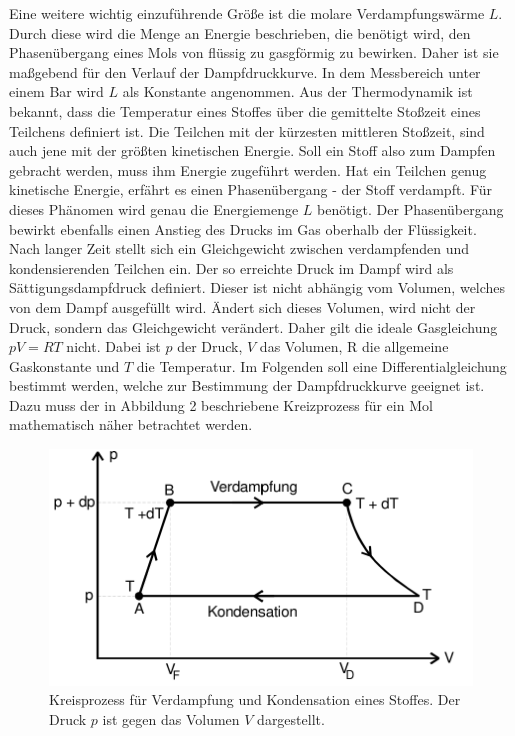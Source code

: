 \noindent
Eine weitere wichtig einzuführende Größe ist die molare Verdampfungswärme $L$. Durch diese wird die Menge an Energie beschrieben, die benötigt wird, den Phasenübergang
eines Mols von flüssig zu gasgförmig zu bewirken.
Daher ist sie maßgebend für den Verlauf der Dampfdruckkurve. In dem Messbereich
unter einem Bar wird $L$ als Konstante angenommen. Aus der Thermodynamik ist bekannt, dass die Temperatur eines Stoffes über die gemittelte Stoßzeit eines Teilchens definiert ist. Die Teilchen
mit der kürzesten mittleren Stoßzeit, sind auch jene mit der größten kinetischen Energie. Soll ein Stoff also zum Dampfen gebracht werden, muss ihm Energie zugeführt werden.
Hat ein Teilchen genug kinetische Energie, erfährt es einen Phasenübergang - der Stoff verdampft. Für dieses Phänomen
wird genau die Energiemenge $L$ benötigt. Der Phasenübergang bewirkt ebenfalls einen Anstieg des Drucks im Gas oberhalb der Flüssigkeit.\\
Nach langer Zeit stellt sich ein Gleichgewicht zwischen verdampfenden und kondensierenden Teilchen ein. Der so erreichte Druck im Dampf
wird als Sättigungsdampfdruck definiert. Dieser ist nicht abhängig vom Volumen, welches von dem Dampf ausgefüllt wird. Ändert sich dieses Volumen, wird nicht der Druck, sondern das Gleichgewicht verändert. 
Daher gilt die ideale Gasgleichung $pV=RT$ nicht. Dabei ist $p$ der Druck, $V$ das Volumen, R die allgemeine Gaskonstante und $T$ die Temperatur. 
Im Folgenden soll eine Differentialgleichung bestimmt werden, welche zur Bestimmung der Dampfdruckkurve geeignet ist.
Dazu muss der in Abbildung 2 beschriebene Kreizprozess für ein Mol mathematisch näher betrachtet werden.
\begin{figure}[h!]
    \centering
    \includegraphics[scale=0.8]{sreen2.jpg}
    \caption{Kreisprozess für Verdampfung und Kondensation eines Stoffes. Der Druck $p$ ist
    gegen das Volumen $V$ dargestellt.\cite{V203_Anleitung} }
    \label{Abb2:Kreisprozess}
\end{figure}
